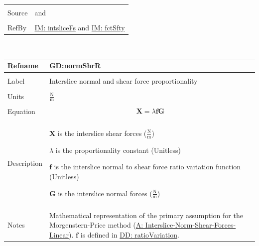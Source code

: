 \documentclass[12pt]{article}
\begin{document}
\begin{minipage}{\textwidth}
\begin{tabular}{>{\raggedright}p{}>{\raggedright\arraybackslash}p{}}
          \\ \midrule \\
          Source & \cite{chen2005} and \cite{karchewski2012}
          \\ \midrule \\
          RefBy & \hyperref[IM:intsliceFs]{IM: intsliceFs} and \hyperref[IM:fctSfty]{IM: fctSfty}
          \\ \bottomrule
          \end{tabular}
          \end{minipage}
\par~

\noindent \begin{minipage}{\textwidth}
          \begin{tabular}{>{\raggedright}p{}>{\raggedright\arraybackslash}p{}}
          \toprule \textbf{Refname} & \textbf{GD:normShrR}
          \label{GD:normShrR}
          \\ \midrule \\
          Label & Interslice normal and shear force proportionality
          \\ \midrule \\
          Units & $\frac{\text{N}}{\text{m}}$
          \\ \midrule \\
          Equation & \begin{displaymath}
                     \mathbf{X}=λ \mathbf{f} \mathbf{G}
                     \end{displaymath}
          \\ \midrule \\
          Description & \begin{symbDescription}
                        \item{$\mathbf{X}$ is the interslice shear forces ($\frac{\text{N}}{\text{m}}$)}
                        \item{$λ$ is the proportionality constant (Unitless)}
                        \item{$\mathbf{f}$ is the interslice normal to shear force ratio variation function (Unitless)}
                        \item{$\mathbf{G}$ is the interslice normal forces ($\frac{\text{N}}{\text{m}}$)}
                        \end{symbDescription}
          \\ \midrule \\
          Notes & Mathematical representation of the primary assumption for the Morgenstern-Price method (\hyperref[assumpINSFL]{A: Interslice-Norm-Shear-Forces-Linear}). $\mathbf{f}$ is defined in \hyperref[DD:ratioVariation]{DD: ratioVariation}.

\end{tabular}
\end{minipage}
\end{document}
